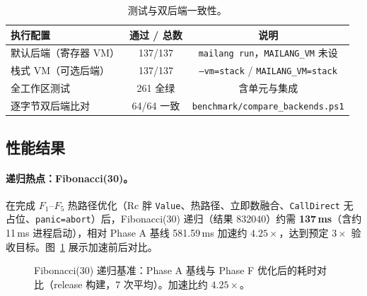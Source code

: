 \documentclass[10pt,a4paper]{article}
\begin{document}
\begin{table}[t]
\centering
\caption{测试与双后端一致性。}
\label{tab:tests}
\small
\begin{tabular}{@{}lcc@{}}
\toprule
\textbf{执行配置} & \textbf{通过 / 总数} & \textbf{说明} \\
\midrule
默认后端（寄存器 VM） & 137/137 & \texttt{mailang run}，\texttt{MAILANG\_VM} 未设 \\
栈式 VM（可选后端） & 137/137 & \texttt{--vm=stack} / \texttt{MAILANG\_VM=stack} \\
全工作区测试 & 261 全绿 & 含单元与集成 \\
逐字节双后端比对 & 64/64 一致 & \texttt{benchmark/compare\_backends.ps1} \\
\bottomrule
\end{tabular}
\end{table}

\subsection{性能结果}

\paragraph{递归热点：Fibonacci(30)。}
在完成 $F_1$--$F_5$ 热路径优化（Rc 胖 \texttt{Value}、热路径、立即数融合、\texttt{CallDirect} 无占位、\texttt{panic=abort}）后，Fibonacci(30) 递归（结果 832040）约需 \textbf{137\,ms}（含约 11\,ms 进程启动），相对 Phase A 基线 581.59\,ms 加速约 \textbf{$4.25\times$}，达到预定 $3\times$ 验收目标。图~\ref{fig:accel} 展示加速前后对比。

\begin{figure}[t]
\centering
{}
\caption{Fibonacci(30) 递归基准：Phase A 基线与 Phase F 优化后的耗时对比（release 构建，7 次平均）。加速比约 $4.25\times$。}
\label{fig:accel}
\end{figure}
\end{document}
